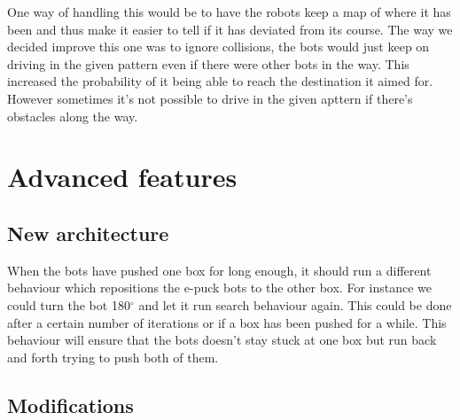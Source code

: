 \documentclass[12pt, a4paper]{article}
\begin{document}
One way of handling this would be to have the robots keep a map of where it has been and thus make it easier to tell if it has deviated from its course. The way we decided improve this one was to ignore collisions, the bots would just keep on driving in the given pattern even if there were other bots in the way. This increased the probability of it being able to reach the destination it aimed for. However sometimes it's not possible to drive in the given apttern if there's obstacles along the way.\\



\section{Advanced features}

\subsection{New architecture}
When the bots have pushed one box for long enough, it should run a different behaviour which repositions the e-puck bots to the other box. For instance we could turn the bot 180$^{\circ}$ and let it run search behaviour again. This could be done after a certain number of iterations or if a box has been pushed for a while. This behaviour will ensure that the bots doesn't stay stuck at one box but run back and forth trying to push both of them.
\subsection{Modifications}
\end{document}
